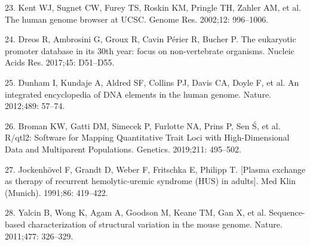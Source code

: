 \documentclass[10pt,letterpaper]{article}
\newenvironment{cslreferences}%
  {}%
  {\par}
\begin{document}
\begin{cslreferences}
\leavevmode\hypertarget{ref-pmid12045153}{}%
23. Kent WJ, Sugnet CW, Furey TS, Roskin KM, Pringle TH, Zahler AM, et
al. The human genome browser at UCSC. Genome Res. 2002;12: 996--1006.

\leavevmode\hypertarget{ref-pmid27899657}{}%
24. Dreos R, Ambrosini G, Groux R, Cavin Périer R, Bucher P. The
eukaryotic promoter database in its 30th year: focus on non-vertebrate
organisms. Nucleic Acids Res. 2017;45: D51--D55.

\leavevmode\hypertarget{ref-pmid22955616}{}%
25. Dunham I, Kundaje A, Aldred SF, Collins PJ, Davis CA, Doyle F, et
al. An integrated encyclopedia of DNA elements in the human genome.
Nature. 2012;489: 57--74.

\leavevmode\hypertarget{ref-pmid30591514}{}%
26. Broman KW, Gatti DM, Simecek P, Furlotte NA, Prins P, Sen Ś, et al.
R/qtl2: Software for Mapping Quantitative Trait Loci with
High-Dimensional Data and Multiparent Populations. Genetics. 2019;211:
495--502.

\leavevmode\hypertarget{ref-pmid1921910}{}%
27. Jockenhövel F, Grandt D, Weber F, Fritschka E, Philipp T. {[}Plasma
exchange as therapy of recurrent hemolytic-uremic syndrome (HUS) in
adults{]}. Med Klin (Munich). 1991;86: 419--422.

\leavevmode\hypertarget{ref-pmid21921916}{}%
28. Yalcin B, Wong K, Agam A, Goodson M, Keane TM, Gan X, et al.
Sequence-based characterization of structural variation in the mouse
genome. Nature. 2011;477: 326--329.
\end{cslreferences}

\nolinenumbers
\end{document}
